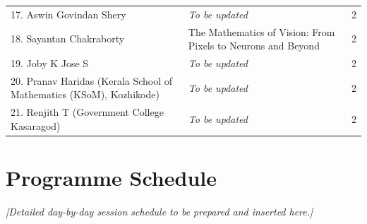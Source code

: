 \documentclass[11pt,a4paper]{article}
\begin{document}
\begin{tabularx}{\textwidth}{@{}l X c@{}}
17. Aswin Govindan Shery & \textit{To be updated} & 2 \\
18. Sayantan Chakraborty & The Mathematics of Vision: From Pixels to Neurons and Beyond & 2 \\
19. Joby K Jose S & \textit{To be updated} & 2 \\
20. Pranav Haridas (Kerala School of Mathematics (KSoM), Kozhikode) & \textit{To be updated} & 2 \\
21. Renjith T (Government College Kasaragod) & \textit{To be updated} & 2 \\
\bottomrule
\end{tabularx}

\vspace{1.5em}

\section*{Programme Schedule}
\begin{center}
    \textit{[Detailed day-by-day session schedule to be prepared and inserted here.]}
\end{center}
\end{document}
